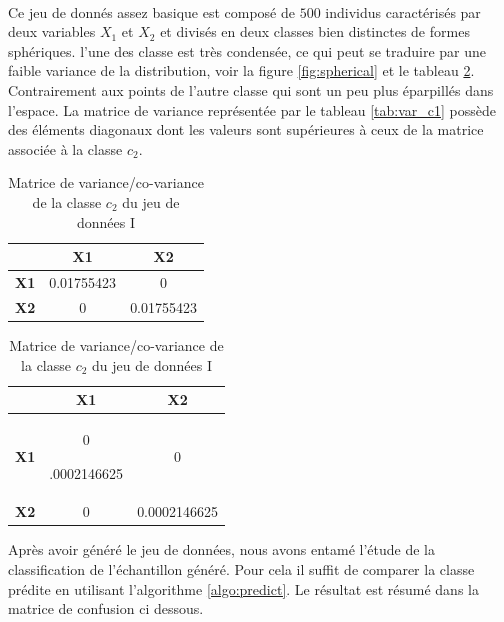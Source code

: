\paragraph{}
Ce jeu de donnés assez basique est composé de $500$ individus caractérisés par deux variables $X_1$ et $X_2$ et divisés en deux classes bien distinctes de formes sphériques. l'une des classe est très condensée, ce qui peut se traduire par une faible variance de la distribution, voir la figure \ref{fig:spherical} et le tableau \ref{tab:var_c2}. Contrairement aux points de l'autre classe qui sont un peu plus éparpillés dans l'espace. La matrice de variance représentée par le tableau \ref{tab:var_c1} possède des éléments diagonaux dont les valeurs sont supérieures à ceux de la matrice associée à la classe $c_2$.
\begin{table}[ht]
	\begin{minipage}[b]{0.45\linewidth}\centering
		\begin{tabular}{|c|c|c|}
			\hline
			\textbf{}   & \textbf{X1}  & \textbf{X2}  \\ \hline
			\textbf{X1} & 0.01755423 & 0            \\ \hline
			\textbf{X2} & 0            & 0.01755423 \\ \hline
		\end{tabular}
		\caption{Matrice de variance/co-variance de la classe $c_1$ du jeu de données I}
		\label{tab:var_c1}
	\end{minipage}
	\hspace{0.5cm}
	\begin{minipage}[b]{0.45\linewidth}
		\centering
		\begin{tabular}{|c|c|c|}
			\hline
			\textbf{}   & \textbf{X1}  & \textbf{X2}  \\ \hline
			\textbf{X1} & 0
			
			.0002146625 & 0            \\ \hline
			\textbf{X2} & 0            & 0.0002146625 \\ \hline
		\end{tabular}
		\caption{Matrice de variance/co-variance de la classe $c_2$ du jeu de données I}
		\label{tab:var_c2}
	\end{minipage}
\end{table}
	\par
	Après avoir généré le jeu de données, nous avons entamé l'étude de la classification de l'échantillon généré. Pour cela il suffit de comparer la classe prédite en utilisant l'algorithme \ref{algo:predict}. Le résultat est résumé dans la matrice de confusion ci dessous.
